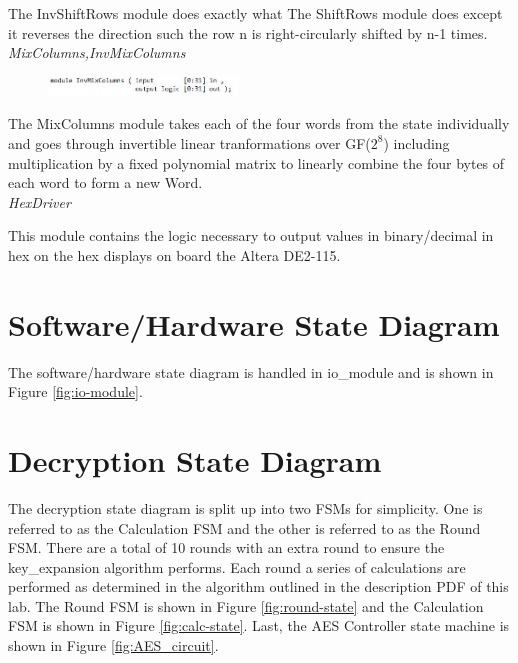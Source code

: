 \documentclass[journal, twocolumn, final,11pt,letterpaper]{IEEEtran}
\begin{document}
The InvShiftRows module does exactly what The ShiftRows module does except it reverses the direction such the row n is right-circularly shifted by n-1 times. \\

\textit{MixColumns,InvMixColumns}\\
\vspace{-4mm}

\begin{figure}[h]
	\centering
	\includegraphics[width=0.45\textwidth]{InvMixColumns.jpg}
	\label{fig:InvMixColumns}
\end{figure}

The MixColumns module takes each of the four words from the state individually and goes through invertible linear tranformations over GF($2^8$) including multiplication by a fixed polynomial matrix to linearly combine the four bytes of each word to form a new Word.\\

\textit{HexDriver}\\
\vspace{-4mm}

This module contains the logic necessary to output values in binary/decimal in hex on the hex displays on board the Altera DE2-115.\\


\section{Software/Hardware State Diagram}
The software/hardware state diagram is handled in io\_module and is shown in Figure \ref{fig:io-module}.

\section{Decryption State Diagram}
The decryption state diagram is split up into two FSMs for simplicity. One is referred to as the Calculation FSM and the other is referred to as the Round FSM. There are a total of 10 rounds with an extra round to ensure the key\_expansion algorithm performs. Each round a series of calculations are performed as determined in the algorithm outlined in the description PDF of this lab. The Round FSM is shown in Figure \ref{fig:round-state} and the Calculation FSM is shown in Figure \ref{fig:calc-state}. Last, the AES Controller state machine is shown in Figure \ref{fig:AES_circuit}.
\end{document}
